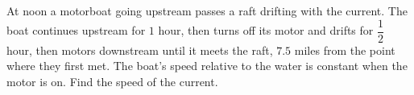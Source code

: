At noon a motorboat going upstream passes a raft drifting with the current. The boat continues upstream for $1$ hour, then turns off its motor and drifts for $\dfrac12$ hour, then motors downstream until it meets the raft, $7.5$ miles from the point where they first met. The boat's speed relative to the water is constant when the motor is on. Find the speed of the current.
